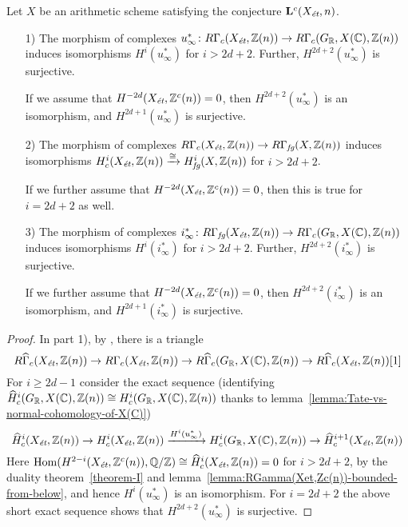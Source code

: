 \documentclass{article}
\numberwithin{equation}{section}
\begin{document}
\begin{lemma}
  \label{lemma:u-infty-iso-in-higher-degrees}
  Let $X$ be an arithmetic scheme satisfying the conjecture
  $\mathbf{L}^c (X_\et, n)$.

  \begin{enumerate}
    \item[1)] The morphism of complexes
    $u_\infty^*\colon R\Gamma_c (X_\et, \ZZ(n)) \to
    R\Gamma_c (G_\RR, X (\CC), \ZZ(n))$
    induces isomorphisms $H^i (u_\infty^*)$ for $i > 2d+2$.
    Further, $H^{2d+2} (u_\infty^*)$ is surjective.

    If we assume that $H^{-2d} (X_\et, \ZZ^c(n)) = 0$, then
    $H^{2d+2} (u_\infty^*)$ is an isomorphism, and $H^{2d+1} (u_\infty^*)$ is
    surjective.

  \item[2)] The morphism of complexes
    $R\Gamma_c (X_\et, \ZZ(n)) \to R\Gamma_\fg (X,\ZZ(n))$ induces
    isomorphisms
    $H^i_c (X_\et, \ZZ(n)) \xrightarrow{\cong} H^i_\fg (X, \ZZ(n))$ for
    $i > 2d + 2$.

    If we further assume that $H^{-2d} (X_\et, \ZZ^c(n)) = 0$, then this is
    true for $i = 2d+2$ as well.

  \item[3)] The morphism of complexes
    $i_\infty^*\colon R\Gamma_\fg (X_\et, \ZZ(n)) \to
    R\Gamma_c (G_\RR, X (\CC), \ZZ(n))$
    induces isomorphisms $H^i (i_\infty^*)$ for $i > 2d+2$.
    Further, $H^{2d+2} (i_\infty^*)$ is surjective.

    If we further assume that $H^{-2d} (X_\et, \ZZ^c(n)) = 0$, then
    $H^{2d+2} (i_\infty^*)$ is an isomorphism, and $H^{2d+1} (i_\infty^*)$ is
    surjective.
  \end{enumerate}

  \begin{proof}
    In part 1), by \cite[Lemma~6.14]{Flach-Morin-2018}, there is a triangle
    \[ R\widehat{\Gamma}_c (X_\et, \ZZ(n)) \to
      R\Gamma_c (X_\et, \ZZ(n)) \to
      R\widehat{\Gamma}_c (G_\RR, X (\CC), \ZZ (n)) \to
      R\widehat{\Gamma}_c (X_\et, \ZZ(n)) [1] \]
    For $i \ge 2d - 1$ consider the exact sequence (identifying
    $\widehat{H}^i_c (G_\RR, X (\CC), \ZZ (n)) \cong H^i_c (G_\RR, X (\CC), \ZZ (n))$
    thanks to lemma~\ref{lemma:Tate-vs-normal-cohomology-of-X(C)})
    \[ \widehat{H}^i_c (X_\et, \ZZ(n)) \to H^i_c (X_\et, \ZZ(n))
      \xrightarrow{H^i (u_\infty^*)} H^i_c (G_\RR, X (\CC), \ZZ (n)) \to
      \widehat{H}^{i+1}_c (X_\et, \ZZ(n)) \]
    Here
    $\Hom (H^{2-i} (X_\et, \ZZ^c (n)), \QQ/\ZZ) \cong \widehat{H}^i_c (X_\et, \ZZ(n)) = 0$
    for $i > 2d + 2$, by the duality theorem~\ref{theorem-I} and
    lemma~\ref{lemma:RGamma(Xet,Zc(n))-bounded-from-below},
    and hence $H^i (u_\infty^*)$ is an isomorphism.
    For $i = 2d+2$ the above short exact sequence shows that
    $H^{2d+2} (u_\infty^*)$ is surjective.


\end{proof}
\end{lemma}
\end{document}
